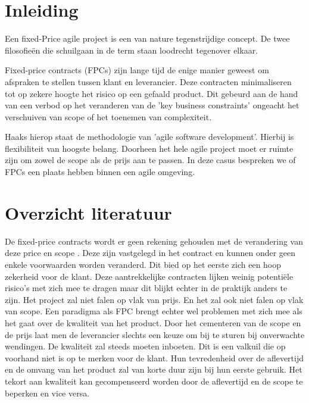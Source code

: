 \documentclass{hogent-article}
\affiliation{
    \textsuperscript{1} \href{mailto:indy.vancanegem@student.hogent.be}{indy.vancanegem@student.hogent.be}}
\affiliation{
    \textsuperscript{2} \href{mailto:mout.pessemier@student.hogent.be}{mout.pessemier@student.hogent.be}}
\affiliation{
    \textsuperscript{3} \href{mailto:nante.vermeulen@student.hogent.be}{nante.vermeulen@student.hogent.be}}
\affiliation{
    \textsuperscript{4} \href{mailto:jef.malfliet@student.hogent.be}{jef.malfliet@student.hogent.be}
}
\begin{document}
	
    \flushbottom
    \tableofcontents 
    \thispagestyle{empty} %
	
	\section{Inleiding}
	 Een fixed-Price agile project is een van nature tegenstrijdige concept. De twee filosofieën die schuilgaan in de term staan loodrecht tegenover elkaar.
     
     Fixed-price contracts (FPCs) zijn lange tijd de enige manier geweest om afspraken te stellen tussen klant en leverancier. Deze contracten minimaliseren tot op zekere hoogte het risico op een gefaald product. Dit gebeurd aan de hand van een verbod op het veranderen van de 'key business constraints' ongeacht het verschuiven van scope of het toenemen van complexiteit.
     
     Haaks hierop staat de methodologie van 'agile software development'. Hierbij is flexibiliteit van hoogste belang. Doorheen het hele agile project moet er ruimte zijn om zowel de scope als de prijs aan te passen. In deze casus bespreken we of FPCs een plaats hebben binnen een agile omgeving.
	
	\section{Overzicht literatuur}
	
    
	De fixed-price contracts wordt er geen rekening gehouden met de verandering van deze price en scope \autocite{SCRUM2012}. Deze zijn vastgelegd in het contract en kunnen onder geen enkele voorwaarden worden veranderd. Dit bied op het eerste zich een hoop zekerheid voor de klant. Deze aantrekkelijke contracten lijken weinig potentiële risico's met zich mee te dragen maar dit blijkt echter in de praktijk anders te zijn. Het project zal niet falen op vlak van prijs. En het zal ook niet falen op vlak van scope. Een paradigma als FPC brengt echter wel problemen met zich mee als het gaat over de kwaliteit van het product. Door het cementeren van de scope en de prijs laat men de leverancier slechts een keuze om bij te sturen bij onverwachte wendingen. De kwaliteit zal steeds moeten inboeten. Dit is een valkuil die op voorhand niet is op te merken voor de klant. Hun tevredenheid over de aflevertijd en de omvang van het product zal van korte duur zijn bij hun eerste gebruik. Het tekort aan kwaliteit kan gecompenseerd worden door de aflevertijd en de scope te beperken en vice versa.
    
\end{document}
